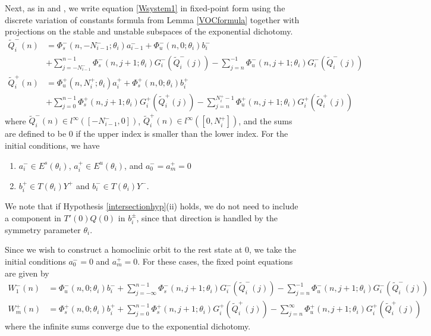 \documentclass[12pt]{article}
\begin{document}
Next, as in \cite{Sandstede1997} and \cite{Knobloch2000}, we write equation \eqref{Wsystem1} in fixed-point form using the discrete variation of constants formula from Lemma \ref{VOCformula} together with projections on the stable and unstable subspaces of the exponential dichotomy.
\begin{equation}\label{FPeqs1}
\begin{aligned}
\tilde{Q}_i^-(n) &= 
\Phi_s^-(n, -N_{i-1}^-; \theta_i) a_{i-1}^- + \Phi_u^-(n, 0; \theta_i) b_i^-  \\
&+ \sum_{j = -N_{i-1}^-}^{n-1} \Phi_s^-(n, j+1; \theta_i) G_i^-(\tilde{Q}_i^-(j)) - \sum_{j = n}^{-1} \Phi_u^-(n, j+1; \theta_i) G_i^-(\tilde{Q}_i^-(j)) \\
\tilde{Q}_i^+(n) &= \Phi_u^+(n, N_i^+; \theta_i) a_i^+ + \Phi_s^+(n, 0; \theta_i) b_i^+ \\
&+ \sum_{j = 0}^{n-1} \Phi_s^+(n, j+1; \theta_i) G_i^+(\tilde{Q}_i^+(j)) 
- \sum_{j = n}^{N_i^+-1} \Phi_u^+(n, j+1; \theta_i) G_i^+(\tilde{Q}_i^+(j))
\end{aligned}
\end{equation}
where $\tilde{Q}_i^-(n) \in l^\infty([-N_{i-1}^-, 0])$, $\tilde{Q}_i^+(n) \in l^\infty([0, N_i^+])$, and the sums are defined to be $0$ if the upper index is smaller than the lower index. For the initial conditions, we have
\begin{enumerate}
\item $a_i^- \in E^s(\theta_i)$, $a_i^+ \in E^u(\theta_i)$, and $a_0^- = a_m^+ = 0$
\item $b_i^+ \in T(\theta_i) Y^+$ and $b_i^- \in T(\theta_i) Y^-$.
\end{enumerate}
We note that if Hypothesis \ref{intersectionhyp}(ii) holds, we do not need to include a component in $T'(0) Q(0)$ in $b_i^\pm$, since that direction is handled by the symmetry parameter $\theta_i$.

Since we wish to construct a homoclinic orbit to the rest state at 0, we take the initial conditions $a_0^- = 0$ and $a_m^+ = 0$. For these cases, the fixed point equations are given by
\begin{align*}
W_1^-(n) &= \Phi_u^-(n, 0; \theta_i) b_i^- 
+ \sum_{j = -\infty}^{n-1} \Phi_s^-(n, j+1; \theta_i) G_i^-(\tilde{Q}_i^-(j)) - \sum_{j = n}^{-1} \Phi_u^-(n, j+1; \theta_i) G_i^-(\tilde{Q}_i^-(j)) \\
W_m^+(n) &= \Phi_s^+(n, 0; \theta_i) b_i^+ 
+ \sum_{j = 0}^{n-1} \Phi_s^+(n, j+1; \theta_i) G_i^+(\tilde{Q}_i^+(j)) 
- \sum_{j = n}^\infty \Phi_u^+(n, j+1; \theta_i) G_i^+(\tilde{Q}_i^+(j))
\end{align*}
where the infinite sums converge due to the exponential dichotomy. 
\end{document}
